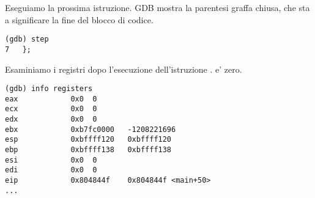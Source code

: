 Eseguiamo la prossima istruzione.
\ac{GDB} mostra la parentesi graffa chiusa, che sta a significare la fine del blocco di codice.

\begin{lstlisting}
(gdb) step
7	};
\end{lstlisting}

Esaminiamo i registri dopo l'esecuzione dell'istruzione .
\EAX e' zero.

\begin{lstlisting}
(gdb) info registers
eax            0x0	0
ecx            0x0	0
edx            0x0	0
ebx            0xb7fc0000	-1208221696
esp            0xbffff120	0xbffff120
ebp            0xbffff138	0xbffff138
esi            0x0	0
edi            0x0	0
eip            0x804844f	0x804844f <main+50>
...
\end{lstlisting}
